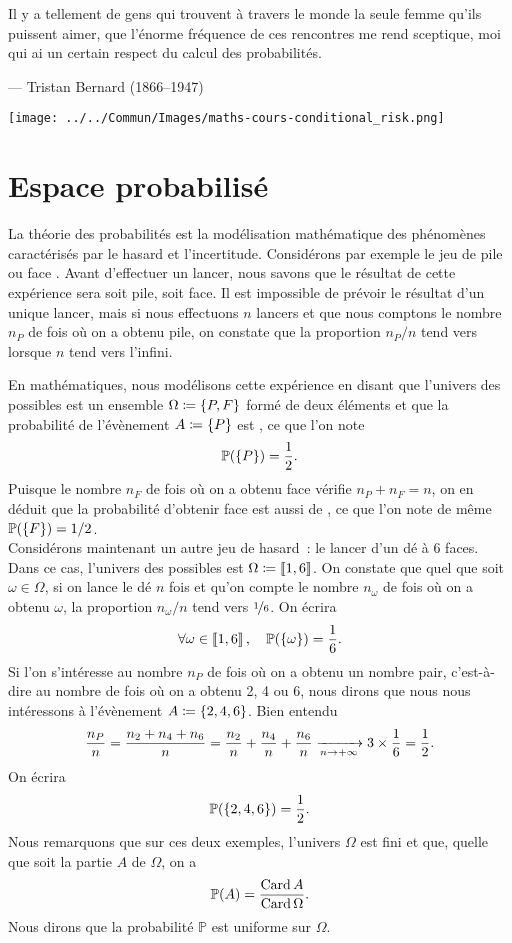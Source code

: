 \documentclass{magnolia}
\begin{document}

\setlength{}
\epigraph{\og Il y a tellement de gens qui trouvent à travers le monde la seule femme qu'ils puissent aimer, que l'énorme fréquence de ces rencontres me rend sceptique, moi qui ai un certain respect du calcul des probabilités. \fg}{--- {\sc Tristan Bernard (1866--1947)}}


\hfill\texttt{[image: ../../Commun/Images/maths-cours-conditional\_risk.png]}

\magtoc

\section{Espace probabilisé}

La théorie des probabilités est la modélisation mathématique des phénomènes caractérisés par
le hasard et l'incertitude. Considérons par exemple le jeu de \og pile ou face \fg.
Avant d'effectuer un lancer, nous savons que le résultat de cette expérience sera soit
pile, soit face. Il est impossible de prévoir le résultat d'un unique lancer, mais si nous effectuons $n$ lancers et que
nous comptons le nombre $n_P$ de fois où on a obtenu pile, on constate que la proportion
$n_P/n$ tend vers  lorsque $n$ tend vers l'infini.


\noindent
En mathématiques, nous modélisons cette expérience en disant que l'univers des possibles est un
ensemble $\Omega\coloneqq\left\{P, F\right\}$ formé de deux éléments  et que la probabilité de l'évènement
$A\coloneqq\left\{P\right\}$ est , ce que l'on note
\[\mathbb{P}(\left\{P\right\})=\frac{1}{2}.\]
Puisque le nombre $n_F$ de fois où on a obtenu face vérifie $n_P+n_F=n$, on en déduit que
la probabilité d'obtenir face est aussi de , ce que l'on note de même
$\mathbb{P}(\left\{F\right\})=1/2$.\\

Considérons maintenant un autre jeu de hasard~: le lancer d'un dé à 6 faces. Dans ce cas,
l'univers des possibles est $\Omega\coloneqq\left\llbracket 1,6\right\rrbracket$. On constate que quel que
soit $\omega\in\Omega$, si on lance le dé $n$ fois et qu'on compte le nombre $n_\omega$ de
fois où on a obtenu $\omega$, la proportion $n_\omega/n$ tend vers $\nicefrac{1}{6}$. On écrira
\[\forall \omega\in\left\llbracket 1,6\right\rrbracket,\quad \mathbb{P}(\left\{\omega\right\})=\frac{1}{6}.\]
Si l'on s'intéresse au nombre $n_P$ de fois où on a obtenu un nombre pair, c'est-à-dire au
nombre de fois où on a obtenu 2, 4 ou 6, nous dirons que nous nous intéressons à l'évènement
$A\coloneqq\left\{2,4,6\right\}$. Bien entendu
\[\frac{n_P}{n}=\frac{n_2+n_4+n_6}{n}=\frac{n_2}{n}+\frac{n_4}{n}+\frac{n_6}{n}
  \xrightarrow[n\rightarrow +\infty]{} 3\times\frac{1}{6}=\frac{1}{2}.\]
On écrira 
\[\mathbb{P}(\left\{2, 4, 6\right\})=\frac{1}{2}.\]
Nous remarquons que sur ces deux exemples, l'univers $\Omega$ est fini et que, quelle que soit
la partie $A$ de $\Omega$, on a
\[\mathbb{P}(A)=\frac{\operatorname{Card} A}{\operatorname{Card} \Omega}.\]
Nous dirons que la probabilité $\mathbb{P}$ est uniforme sur $\Omega$.\\
\end{document}

